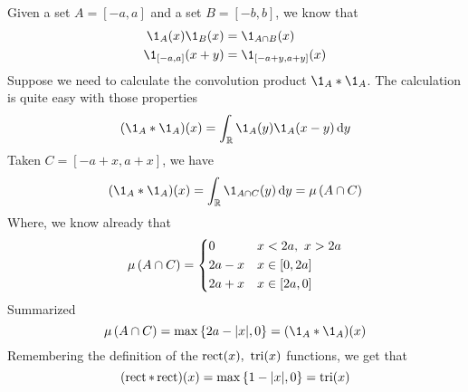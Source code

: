 \documentclass[../complete.tex]{subfiles}
\begin{document}
\begin{eg}
	Given a set $A=[-a,a]$ and a set $B=[-b,b]$, we know that
	\begin{equation*}
		\begin{aligned}
			\1_A(x)\1_B(x)&=\1_{A\cap B}(x)\\
			\1_{[-a,a]}(x+y)&=\1_{[-a+y,a+y]}(x)
		\end{aligned}
	\end{equation*}
	Suppose we need to calculate the convolution product $\1_A*\1_A$. The calculation is quite easy with those properties
	\begin{equation*}
		(\1_A*\1_A)(x)=\int_{\R}^{}\1_A(y)\1_A(x-y)\diff y
	\end{equation*}
	Taken $C=[-a+x,a+x]$, we have
	\begin{equation*}
		(\1_A*\1_A)(x)=\int_{\R}^{}\1_{A\cap C}(y)\diff y=\mu\left( A\cap C \right)
	\end{equation*}
	Where, we know already that
	\begin{equation*}
		\mu\left( A\cap C \right)=\begin{dcases}0&x<2a,\ x>2a\\2a-x&x\in[0,2a]\\2a+x&x\in[2a,0]\end{dcases}
	\end{equation*}
	Summarized
	\begin{equation*}
		\mu\left( A\cap C \right)=\max\left\{ 2a-\abs{x},0 \right\}=(\1_A*\1_A)(x)
	\end{equation*}
	Remembering the definition of the $\rect(x),\ \tri(x)$ functions, we get that
	\begin{equation*}
		(\operatorname{\mathrm{rect}}*\operatorname{\mathrm{rect}})(x)=\max\left\{ 1-\abs{x},0 \right\}=\operatorname{\mathrm{tri}}(x)
	\end{equation*}
\end{eg}
\end{document}
